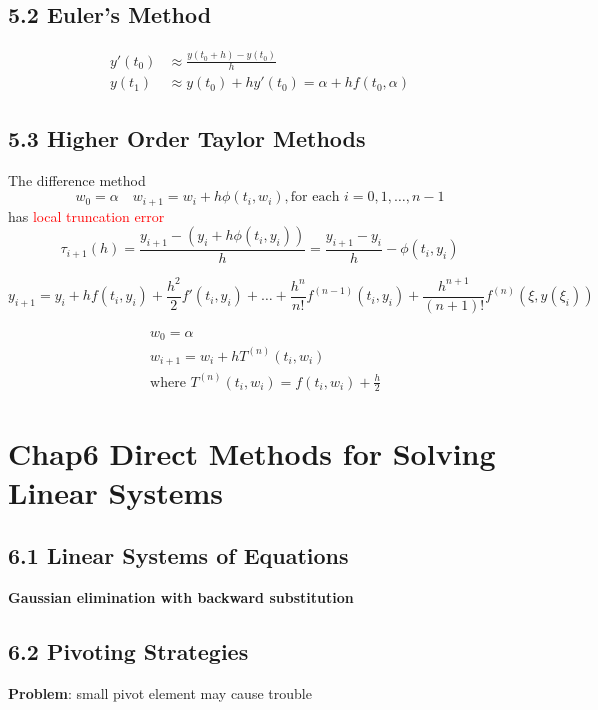 \documentclass[11pt]{article}
\begin{document}
\subsection{5.2 Euler's Method}
\label{sec:orgd41e932}
\begin{align*}
y'(t_0)&\approx\frac{y(t_0+h)-y(t_0)}{h}\\
y(t_1)&\approx y(t_0)+hy'(t_0)=\alpha+hf(t_0,\alpha)
\end{align*}
\subsection{5.3 Higher Order Taylor Methods}
\label{sec:org39e99e5}
\begin{definition}
The difference method
\begin{equation*}
w_0=\alpha\quad w_{i+1}=w_i+h\phi(t_i,w_i), \text{for each } i = 0,1,\dots, n-1
\end{equation*}
has \textcolor{red}{local truncation error}
\begin{equation*}
\tau_{i+1}(h)=\frac{y_{i+1}-(y_i+h\phi(t_i,y_i))}{h}=\frac{y_{i+1}-y_i}{h}-\phi(t_i,y_i)
\end{equation*}
\end{definition}

\begin{equation*}
y_{i+1}=y_i+hf(t_i,y_i)+\frac{h^2}{2}f'(t_i,y_i)+\dots+\frac{h^n}{n!}f^{(n-1)}(t_i,y_i)
+ \frac{h^{n+1}}{(n+1)!}f^{(n)}(\xi, y(\xi_i))
\end{equation*}

\begin{align*}
&w_0=\alpha\\
&w_{i+1}=w_i+hT^{(n)}(t_i,w_i)\\
&\text{where } T^{(n)}(t_i,w_i)=f(t_i,w_i)+\frac{h}{2}
\end{align*}
\section{Chap6 Direct Methods for Solving Linear Systems}
\label{sec:org5e6ce43}
\subsection{6.1 Linear Systems of Equations}
\label{sec:org4fdd28e}
\textbf{Gaussian elimination with backward substitution}
\subsection{6.2 Pivoting Strategies}
\label{sec:orgecfd7a7}
\textbf{Problem}: small pivot element may cause trouble
\end{document}
